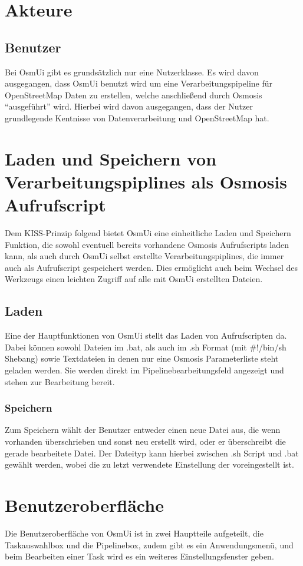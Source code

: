 \documentclass[a4paper,10pt]{scrartcl}
\begin{document}
\section{Akteure}
\subsection{Benutzer}
Bei OsmUi gibt es grundsätzlich nur eine Nutzerklasse. Es wird davon ausgegangen, dass OsmUi benutzt wird um eine Verarbeitungspipeline für OpenStreetMap Daten
zu erstellen, welche anschließend durch Osmosis ``ausgeführt'' wird. Hierbei wird davon ausgegangen, dass der Nutzer grundlegende Kentnisse 
von Datenverarbeitung und OpenStreetMap hat.

\section{Laden und Speichern von Verarbeitungspiplines als Osmosis Aufrufscript}
Dem KISS-Prinzip folgend bietet OsmUi eine einheitliche Laden und Speichern Funktion, die sowohl eventuell bereits vorhandene Osmosis Aufrufscripts
laden kann, als auch durch OsmUi selbst erstellte Verarbeitungspiplines, die immer auch als Aufrufscript gespeichert werden. 
Dies ermöglicht auch beim Wechsel des Werkzeugs einen leichten Zugriff auf alle mit OsmUi erstellten Dateien.
\subsection{Laden}
Eine der Hauptfunktionen von OsmUi stellt das Laden von Aufrufscripten da. Dabei können sowohl Dateien im .bat, als auch im .sh Format (mit \#!/bin/sh Shebang)
sowie Textdateien in denen nur eine Osmosis Parameterliste steht geladen werden. Sie werden direkt im Pipelinebearbeitungsfeld angezeigt und
stehen zur Bearbeitung bereit.
\subsubsection{Speichern}
Zum Speichern wählt der Benutzer entweder einen neue Datei aus, die wenn vorhanden überschrieben und sonst neu erstellt wird, oder er überschreibt die gerade bearbeitete Datei.
Der Dateityp kann hierbei zwischen .sh Script und .bat gewählt werden, wobei die zu letzt verwendete Einstellung der voreingestellt ist.

\section{Benutzeroberfläche}
Die Benutzeroberfläche von OsmUi ist in zwei Hauptteile aufgeteilt, die Taskauswahlbox und die Pipelinebox, zudem gibt es ein Anwendungsmenü, und beim Bearbeiten einer Task wird es ein weiteres Einstellungsfenster
geben.
\end{document}
